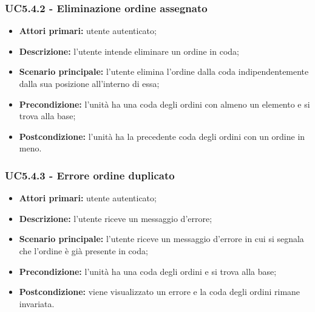 \subsubsection{UC5.4.2 - Eliminazione ordine assegnato}
\begin{itemize}
    \item \textbf{Attori primari:} utente autenticato;
    \item \textbf{Descrizione:} l'utente intende eliminare un ordine in coda;
    \item \textbf{Scenario principale:} l'utente elimina l'ordine dalla coda indipendentemente dalla sua posizione all'interno di essa;
    \item \textbf{Precondizione:} l'unità ha una coda degli ordini con almeno un elemento e si trova alla base;
    \item \textbf{Postcondizione:} l'unità ha la precedente coda degli ordini con un ordine in meno.
\end{itemize}

\subsubsection{UC5.4.3 - Errore ordine duplicato}
\begin{itemize}
    \item \textbf{Attori primari:} utente autenticato;
    \item \textbf{Descrizione:} l'utente riceve un messaggio d'errore;
    \item \textbf{Scenario principale:} l'utente riceve un messaggio d'errore in cui si segnala che l'ordine è già presente in coda;
    \item \textbf{Precondizione:} l'unità ha una coda degli ordini e si trova alla base;
    \item \textbf{Postcondizione:} viene visualizzato un errore e la coda degli ordini rimane invariata.
\end{itemize}